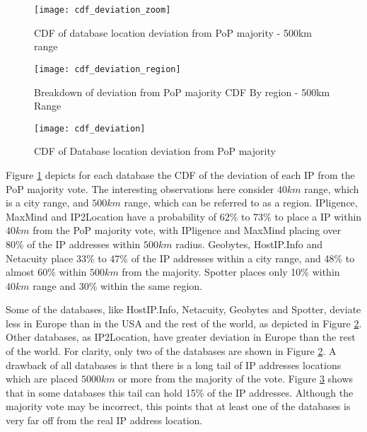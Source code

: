 \begin{figure}
\begin{minipage}[b]{\linewidth}
\centering
\texttt{[image: cdf\_deviation\_zoom]}
\caption{CDF of database location deviation from PoP majority -
500km range} \label{fig:cdf_deviation_zoom}
\end{minipage}
\end{figure}

\begin{figure}
\begin{minipage}[b]{\linewidth}
\centering
\texttt{[image: cdf\_deviation\_region]}
\caption{Breakdown of deviation from PoP majority CDF By region -
500km Range} \label{fig:cdf_deviation_region}
\end{minipage}
\end{figure}



\begin{figure}
\begin{minipage}[b]{\linewidth}
\centering
\texttt{[image: cdf\_deviation]}
\caption{CDF of Database location deviation from PoP majority}
\label{fig:cdf_deviation}
\end{minipage}
\end{figure}


Figure \ref{fig:cdf_deviation_zoom} depicts for each database the
CDF of the deviation of each IP from the PoP majority vote. The
interesting observations here consider $40km$ range, which is a city
range, and $500km$ range, which can be referred to as a region.
IPligence, MaxMind and IP2Location have a probability of 62\% to
73\% to place a IP within $40km$ from the PoP majority vote, with
IPligence and MaxMind placing over 80\% of the IP addresses within
$500km$ radius. Geobytes, HostIP.Info and Netacuity place 33\% to
47\% of the IP addresses within a city range, and 48\% to almost
60\% within $500km$ from the majority. Spotter places only 10\%
within $40km$ range and 30\% within the same region.

Some of the databases, like HostIP.Info, Netacuity, Geobytes and
Spotter, deviate less in Europe than in the USA and the rest of the
world, as depicted in Figure \ref{fig:cdf_deviation_region}. Other
databases, as IP2Location, have greater deviation in Europe than the
rest of the world. For clarity, only two of the databases are shown
in Figure \ref{fig:cdf_deviation_region}. A drawback of all
databases is that there is a long tail of IP addresses locations
which are placed $5000km$ or more from the majority of the vote.
Figure \ref{fig:cdf_deviation} shows that in some databases this
tail can hold 15\% of the IP addresses. Although the majority vote
may be incorrect, this points that at least one of the databases is
very far off from the real IP address location.

